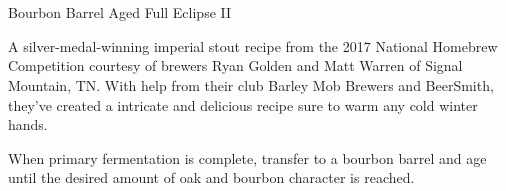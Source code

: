 \part{\stylerussianimperialstout}

\begin{recipie}{Bourbon Barrel Aged Full Eclipse II}

\begin{aboutblock}
A silver-medal-winning imperial stout recipe from the 2017 National Homebrew
Competition courtesy of brewers Ryan Golden and Matt Warren of Signal Mountain, TN.
With help from their club Barley Mob Brewers and BeerSmith, they've created a
intricate and delicious recipe sure to warm any cold winter hands. 
\end{aboutblock}


\begin{methodandtiming}
 
\begin{mashsteps}
\end{mashsteps}

\begin{fermentationsteps}
\end{fermentationsteps}

\begin{directions}
When primary fermentation is complete, transfer to a bourbon barrel and age until
the desired amount of oak and bourbon character is reached.
\end{directions}

\end{methodandtiming}

\pagebreak

\begin{ingredientsblock}

\begin{malts}
\end{malts}

\begin{hops}

\end{hops}

\begin{yeasts}
\end{yeasts}

\end{ingredientsblock}

\end{recipie}